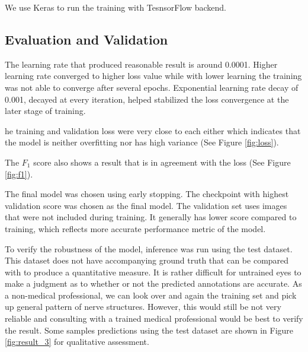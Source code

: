 We use Keras \cite{chollet2015keras} to run the training with TesnsorFlow \cite{tensorflow2015-whitepaper} backend.


\subsection{Evaluation and Validation}
The learning rate that produced reasonable result is around 0.0001. Higher learning rate converged to higher loss value while with lower learning the training was not able to converge after several epochs. Exponential learning rate decay of 0.001, decayed at every iteration, helped stabilized the loss convergence at the later stage of training.

he training and validation loss were very close to each either which indicates that the model is neither overfitting nor has high variance (See Figure \ref{fig:loss}).

The $F_1$ score also shows a result that is in agreement with the loss (See Figure \ref{fig:f1}).

The final model was chosen using early stopping. The checkpoint with highest validation score was chosen as the final model. The validation set uses images that were not included during training. It generally has lower score compared to training, which reflects more accurate performance metric of the model.


To verify the robustness of the model, inference was run using the test dataset. This dataset does not have accompanying ground truth that can be compared with to produce a quantitative measure. It is rather difficult for untrained eyes to make a judgment as to whether or not the predicted annotations are accurate. As a non-medical professional, we can look over and again the training set and pick up general pattern of nerve structures. However, this would still be not very reliable and consulting with a trained medical professional would be best to verify the result. Some samples predictions using the test dataset are shown in Figure \ref{fig:result_3} for qualitative assessment.